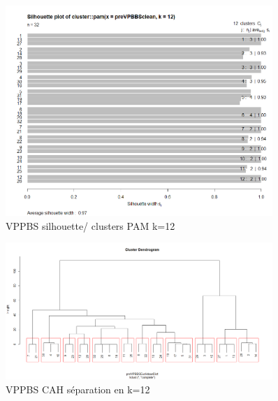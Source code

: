 \begin{figure}[H]
\centering
\includegraphics[width=0.90\textwidth]{../Fig/VPPBS/vppbs-sil-k12-pre.png}
\caption{VPPBS silhouette/ clusters PAM k=12 }
\end{figure}

\begin{figure}[H]
\centering
\includegraphics[width=0.90\textwidth]{../Fig/VPPBS/vppbs-cah-k12-pre.png}
\caption{VPPBS CAH séparation en k=12 }
\end{figure}


%
%











%
